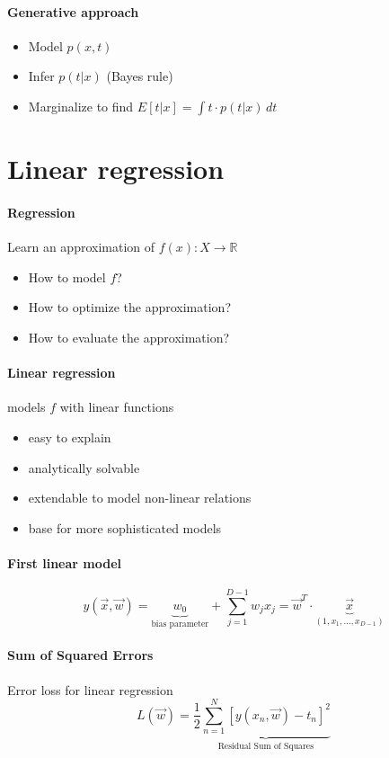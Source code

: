 \documentclass{article}
\newcommand{\R}{\mathds{R}}
\begin{document}
\paragraph{Generative approach}
\begin{itemize}
\item Model $p(x,t)$
\item Infer $p(t|x)$ (Bayes rule)
\item Marginalize to find ${E[t|x]=\int t\cdot p(t|x)\, dt}$
\end{itemize}

\section{Linear  regression}
\paragraph{Regression} Learn an approximation of $f(x):X\to \R$
\begin{itemize}
\item How to model $f$?
\item How to optimize the approximation?
\item How to evaluate the approximation?
\end{itemize}
\paragraph{Linear regression} models $f$ with linear functions
\begin{itemize}
\item easy to explain
\item analytically solvable
\item extendable to model non-linear relations
\item base for more sophisticated models
\end{itemize}
\paragraph{First linear model}
\[
y(\vec{x},\vec{w})=
\underbrace{w_0}_{\text{bias parameter}}
+\sum_{j=1}^{D-1} w_jx_j
=\vec{w}^T \cdot \underbrace{\vec{x}}_{(1,x_1,...,x_{D-1})}
\]
\paragraph{Sum of Squared Errors}
Error loss for linear regression
\[
L(\vec{w})=\frac{1}{2} \underbrace{\sum_{n=1}^N \left[y(x_n,\vec{w})-t_n\right]^2}_{\text{Residual Sum of Squares}}
\]
\end{document}
